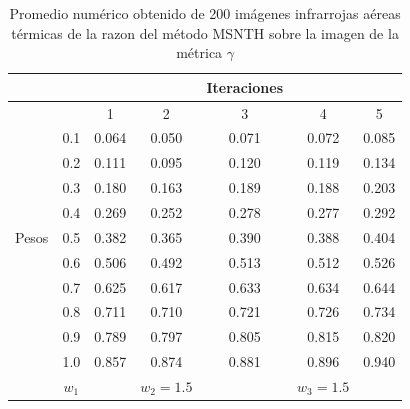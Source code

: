 \documentclass[a4paper, 11 pt, conference]{ieeeconf}      %
\begin{document}
\begin{table}[h]
\centering
\tiny
\caption{Promedio num\'erico obtenido de 200 im\'agenes infrarrojas a\'ereas t\'ermicas de la razon del m\'etodo MSNTH sobre la imagen de la m\'etrica $\gamma$}
\label{tabla_8}
\begin{center}
\begin{tabular}{ c c c c c c c }
\hline
&  &  &  & Iteraciones &  & \\
\hline
 &     & 1 & 2 & 3 & 4 & 5 \\
\hline
 & \vline \hspace{1} 0.1 \hspace{1} \vline & 0.064 & 0.050 & 0.071 & 0.072 & 0.085 \\
 & \vline \hspace{1} 0.2 \hspace{1} \vline & 0.111 & 0.095 & 0.120 & 0.119 & 0.134 \\
 & \vline \hspace{1} 0.3 \hspace{1} \vline & 0.180 & 0.163  & 0.189 & 0.188 & 0.203  \\
 & \vline \hspace{1} 0.4 \hspace{1} \vline & 0.269 & 0.252 & 0.278 & 0.277 & 0.292 \\
Pesos & \vline \hspace{1} 0.5 \hspace{1} \vline & 0.382 & 0.365 & 0.390 & 0.388 & 0.404   \\
 & \vline \hspace{1} 0.6 \hspace{1} \vline & 0.506 & 0.492 & 0.513 & 0.512 & 0.526 \\
 & \vline \hspace{1} 0.7 \hspace{1} \vline & 0.625 & 0.617 & 0.633 & 0.634 & 0.644 \\
 & \vline \hspace{1} 0.8 \hspace{1} \vline & 0.711 & 0.710 & 0.721 & 0.726 & 0.734 \\
 & \vline \hspace{1} 0.9 \hspace{1} \vline & 0.789 & 0.797 & 0.805 & 0.815 & 0.820 \\
 & \vline \hspace{1} 1.0 \hspace{1} \vline & 0.857 & 0.874 & 0.881 & 0.896 & 0.940 \\
\hline
& $w_{1}$ & & $w_{2}=1.5$ & & $w_{3}=1.5$ &  \\
\hline
\end{tabular}
\end{center}
\end{table}
\end{document}
